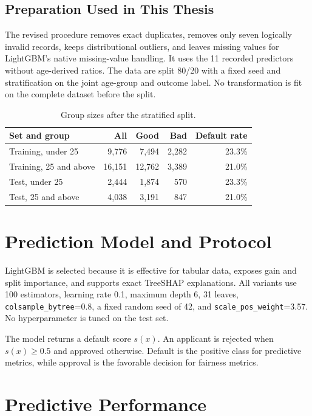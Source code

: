 \subsection{Preparation Used in This Thesis}

The revised procedure removes exact duplicates, removes only seven logically
invalid records, keeps distributional outliers, and leaves missing values for
LightGBM's native missing-value handling. It uses the 11 recorded predictors
without age-derived ratios. The data are split 80/20 with a fixed seed and
stratification on the joint age-group and outcome label. No transformation is
fit on the complete dataset before the split.

\begin{table}[H]
\centering
\caption{Group sizes after the stratified split.}
\label{tab:group-sizes}
\begin{tabular}{lrrrr}
\toprule
\textbf{Set and group} & \textbf{All} & \textbf{Good} & \textbf{Bad}
& \textbf{Default rate}\\
\midrule
Training, under 25 & 9,776 & 7,494 & 2,282 & 23.3\%\\
Training, 25 and above & 16,151 & 12,762 & 3,389 & 21.0\%\\
Test, under 25 & 2,444 & 1,874 & 570 & 23.3\%\\
Test, 25 and above & 4,038 & 3,191 & 847 & 21.0\%\\
\bottomrule
\end{tabular}
\end{table}

\section{Prediction Model and Protocol}

LightGBM is selected because it is effective for tabular data, exposes gain
and split importance, and supports exact TreeSHAP explanations. All variants
use 100 estimators, learning rate 0.1, maximum depth 6, 31 leaves,
\texttt{colsample\_bytree}=0.8, a fixed random seed of 42, and
\texttt{scale\_pos\_weight}=3.57. No hyperparameter is tuned on the test set.

The model returns a default score $s(x)$. An applicant is rejected when
$s(x)\geq 0.5$ and approved otherwise. Default is the positive class for
predictive metrics, while approval is the favorable decision for fairness
metrics.

\section{Predictive Performance}

